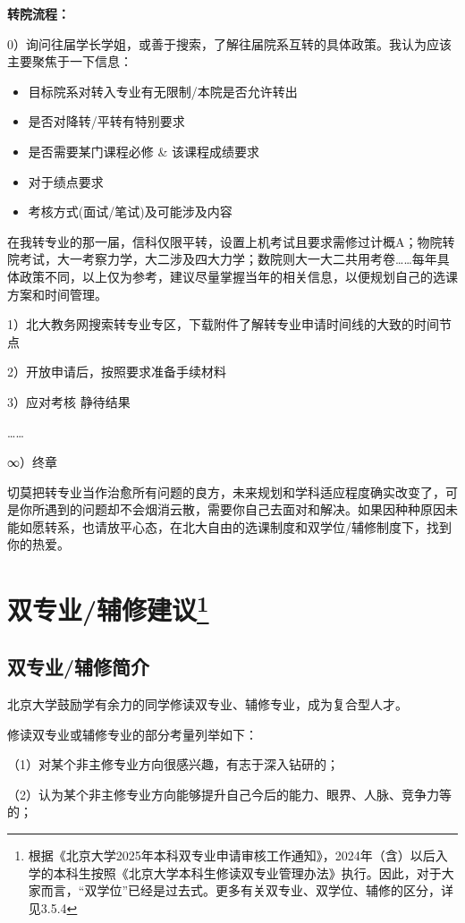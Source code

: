 \documentclass[11pt,oneside]{book}
\begin{document}
\textbf{\textbf{转院流程}}\textbf{\textbf{：}}

0）询问往届学长学姐，或善于搜索，了解往届院系互转的具体政策。我认为应该主要聚焦于一下信息：

\begin{itemize}
	\item 目标院系对转入专业有无限制/本院是否允许转出
	\item 是否对降转/平转有特别要求
	\item 是否需要某门课程必修 \& 该课程成绩要求
	\item 对于绩点要求
	\item 考核方式(面试/笔试)及可能涉及内容
\end{itemize}

在我转专业的那一届，信科仅限平转，设置上机考试且要求需修过计概A；物院转院考试，大一考察力学，大二涉及四大力学；数院则大一大二共用考卷……每年具体政策不同，以上仅为参考，建议尽量掌握当年的相关信息，以便规划自己的选课方案和时间管理。

1）北大教务网搜索转专业专区，下载附件了解转专业申请时间线的大致的时间节点

2）开放申请后，按照要求准备手续材料

3）应对考核 静待结果

……

∞）终章

切莫把转专业当作治愈所有问题的良方，未来规划和学科适应程度确实改变了，可是你所遇到的问题却不会烟消云散，需要你自己去面对和解决。如果因种种原因未能如愿转系，也请放平心态，在北大自由的选课制度和双学位/辅修制度下，找到你的热爱。

\newpage

\section[双专业/辅修建议]{双专业/辅修建议\footnote{根据《北京大学2025年本科双专业申请审核工作通知》，2024年（含）以后入学的本科生按照《北京大学本科生修读双专业管理办法》执行。因此，对于大家而言，“双学位”已经是过去式。更多有关双专业、双学位、辅修的区分，详见3.5.4}}
\subsection{双专业/辅修简介}
北京大学鼓励学有余力的同学修读双专业、辅修专业，成为复合型人才。

修读双专业或辅修专业的部分考量列举如下：

（1）对某个非主修专业方向很感兴趣，有志于深入钻研的；

（2）认为某个非主修专业方向能够提升自己今后的能力、眼界、人脉、竞争力等的；
\end{document}
